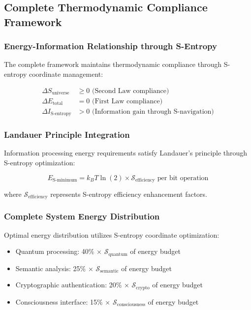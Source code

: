\documentclass[12pt,a4paper]{article}
\begin{document}
{{{{{{{{{{{{{{\subsection{Complete Thermodynamic Compliance Framework}

\subsubsection{Energy-Information Relationship through S-Entropy}

The complete framework maintains thermodynamic compliance through S-entropy coordinate management:

\begin{align}
\Delta S_{\text{universe}} &\geq 0 \text{ (Second Law compliance)} \\
\Delta E_{\text{total}} &= 0 \text{ (First Law compliance)} \\
\Delta I_{\text{S-entropy}} &> 0 \text{ (Information gain through S-navigation)}
\end{align}

\subsubsection{Landauer Principle Integration}

Information processing energy requirements satisfy Landauer's principle through S-entropy optimization:

\begin{equation}
E_{\text{S-minimum}} = k_B T \ln(2) \times \mathcal{S}_{\text{efficiency}} \text{ per bit operation}
\end{equation}

where $\mathcal{S}_{\text{efficiency}}$ represents S-entropy efficiency enhancement factors.

\subsubsection{Complete System Energy Distribution}

Optimal energy distribution utilizes S-entropy coordinate optimization:

\begin{itemize}
\item Quantum processing: 40\% × $\mathcal{S}_{\text{quantum}}$ of energy budget
\item Semantic analysis: 25\% × $\mathcal{S}_{\text{semantic}}$ of energy budget
\item Cryptographic authentication: 20\% × $\mathcal{S}_{\text{crypto}}$ of energy budget
\item Consciousness interface: 15\% × $\mathcal{S}_{\text{consciousness}}$ of energy budget
\end{itemize}

}}}}}}}}}}}}}}
\end{document}
